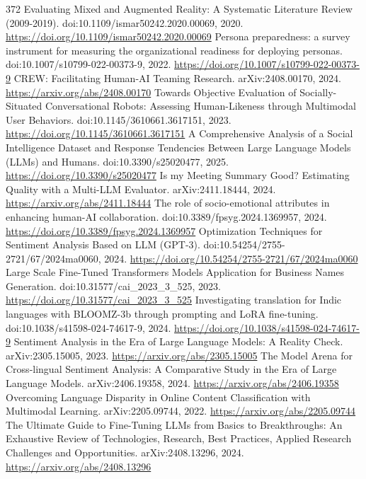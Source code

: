 \documentclass[11pt]{article}
\begin{document}
\begin{thebibliography}{372}
 Evaluating Mixed and Augmented Reality: A Systematic Literature Review (2009-2019). doi:10.1109/ismar50242.2020.00069, 2020. \url{https://doi.org/10.1109/ismar50242.2020.00069}
 Persona preparedness: a survey instrument for measuring the organizational readiness for deploying personas. doi:10.1007/s10799-022-00373-9, 2022. \url{https://doi.org/10.1007/s10799-022-00373-9}
 CREW: Facilitating Human-AI Teaming Research. arXiv:2408.00170, 2024. \url{https://arxiv.org/abs/2408.00170}
 Towards Objective Evaluation of Socially-Situated Conversational Robots: Assessing Human-Likeness through Multimodal User Behaviors. doi:10.1145/3610661.3617151, 2023. \url{https://doi.org/10.1145/3610661.3617151}
 A Comprehensive Analysis of a Social Intelligence Dataset and Response Tendencies Between Large Language Models (LLMs) and Humans. doi:10.3390/s25020477, 2025. \url{https://doi.org/10.3390/s25020477}
 Is my Meeting Summary Good? Estimating Quality with a Multi-LLM Evaluator. arXiv:2411.18444, 2024. \url{https://arxiv.org/abs/2411.18444}
 The role of socio-emotional attributes in enhancing human-AI collaboration. doi:10.3389/fpsyg.2024.1369957, 2024. \url{https://doi.org/10.3389/fpsyg.2024.1369957}
 Optimization Techniques for Sentiment Analysis Based on LLM (GPT-3). doi:10.54254/2755-2721/67/2024ma0060, 2024. \url{https://doi.org/10.54254/2755-2721/67/2024ma0060}
 Large Scale Fine-Tuned Transformers Models Application for Business Names Generation. doi:10.31577/cai\_2023\_3\_525, 2023. \url{https://doi.org/10.31577/cai_2023_3_525}
 Investigating translation for Indic languages with BLOOMZ-3b through prompting and LoRA fine-tuning. doi:10.1038/s41598-024-74617-9, 2024. \url{https://doi.org/10.1038/s41598-024-74617-9}
 Sentiment Analysis in the Era of Large Language Models: A Reality Check. arXiv:2305.15005, 2023. \url{https://arxiv.org/abs/2305.15005}
 The Model Arena for Cross-lingual Sentiment Analysis: A Comparative Study in the Era of Large Language Models. arXiv:2406.19358, 2024. \url{https://arxiv.org/abs/2406.19358}
 Overcoming Language Disparity in Online Content Classification with Multimodal Learning. arXiv:2205.09744, 2022. \url{https://arxiv.org/abs/2205.09744}
 The Ultimate Guide to Fine-Tuning LLMs from Basics to Breakthroughs: An Exhaustive Review of Technologies, Research, Best Practices, Applied Research Challenges and Opportunities. arXiv:2408.13296, 2024. \url{https://arxiv.org/abs/2408.13296}

\end{thebibliography}
\end{document}
